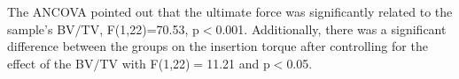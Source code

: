 \documentclass[12pt, a4paper, twoside]{report}
\begin{document}
%
The ANCOVA pointed out that the ultimate force was significantly related to the sample's BV$/$TV, F(1,22)=70.53, p$<$0.001.
Additionally, there was a significant difference between the groups on the insertion torque after controlling for the effect of the BV$/$TV with F(1,22)$=$11.21 and p$<$0.05.
%
%
%
\end{document}
